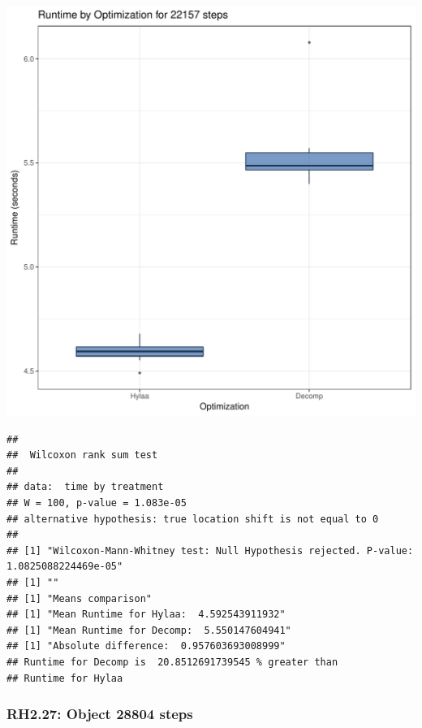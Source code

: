 \documentclass{article}\usepackage[]{graphicx}\usepackage[]{color}
\makeatletter
\def\maxwidth{ %
  \ifdim\Gin@nat@width>\linewidth
    \linewidth
  \else
    \Gin@nat@width
  \fi
}
\newenvironment{kframe}{%
 \def\at@end@of@kframe{}%
 \ifinner\ifhmode%
  \def\at@end@of@kframe{\end{minipage}}%
  \begin{minipage}{\columnwidth}%
 \fi\fi%
 \def\FrameCommand##1{\hskip\@totalleftmargin \hskip-\fboxsep
 \colorbox{shadecolor}{##1}\hskip-\fboxsep
     \hskip-\linewidth \hskip-\@totalleftmargin \hskip\columnwidth}%
 \MakeFramed {\advance\hsize-\width
   \@totalleftmargin\z@ \linewidth\hsize
   \@setminipage}}%
 {\par\unskip\endMakeFramed%
 \at@end@of@kframe}
\newenvironment{knitrout}{}{} %
\makeatother
\begin{document}
\begin{knitrout}
\color{fgcolor}
\includegraphics[width=\maxwidth]{figure/RH2_steps22157-1} 
\begin{kframe}\begin{verbatim}
## 
## 	Wilcoxon rank sum test
## 
## data:  time by treatment
## W = 100, p-value = 1.083e-05
## alternative hypothesis: true location shift is not equal to 0
## 
## [1] "Wilcoxon-Mann-Whitney test: Null Hypothesis rejected. P-value: 1.0825088224469e-05"
## [1] ""
## [1] "Means comparison"
## [1] "Mean Runtime for Hylaa:  4.592543911932"
## [1] "Mean Runtime for Decomp:  5.550147604941"
## [1] "Absolute difference:  0.957603693008999"
## Runtime for Decomp is  20.8512691739545 % greater than 
## Runtime for Hylaa
\end{verbatim}
\end{kframe}
\end{knitrout}


\subsubsection{RH2.27: Object 28804 steps}
\end{document}
